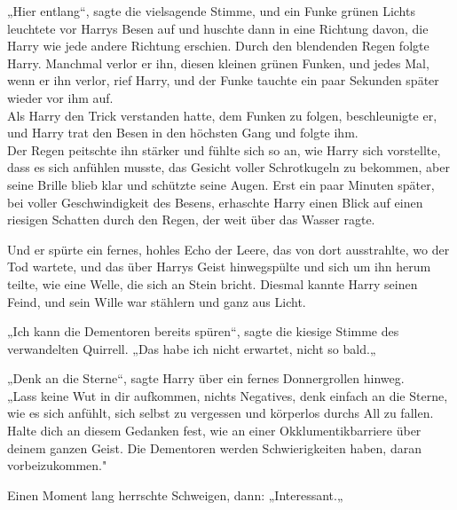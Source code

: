 {„Hier entlang“, sagte die vielsagende Stimme, und ein Funke grünen Lichts leuchtete vor Harrys Besen auf und huschte dann in eine Richtung davon, die Harry wie jede andere Richtung erschien. Durch den blendenden Regen folgte Harry. Manchmal verlor er ihn, diesen kleinen grünen Funken, und jedes Mal, wenn er ihn verlor, rief Harry, und der Funke tauchte ein paar Sekunden später wieder vor ihm auf.\\ Als Harry den Trick verstanden hatte, dem Funken zu folgen, beschleunigte er, und Harry trat den Besen in den höchsten Gang und folgte ihm.\\ Der Regen peitschte ihn stärker und fühlte sich so an, wie Harry sich vorstellte, dass es sich anfühlen musste, das Gesicht voller Schrotkugeln zu bekommen, aber seine Brille blieb klar und schützte seine Augen. Erst ein paar Minuten später, bei voller Geschwindigkeit des Besens, erhaschte Harry einen Blick auf einen riesigen Schatten durch den Regen, der weit über das Wasser ragte.

Und er spürte ein fernes, hohles Echo der Leere, das von dort ausstrahlte, wo der Tod wartete, und das über Harrys Geist hinwegspülte und sich um ihn herum teilte, wie eine Welle, die sich an Stein bricht. Diesmal kannte Harry seinen Feind, und sein Wille war stählern und ganz aus Licht.

„Ich kann die Dementoren bereits spüren“, sagte die kiesige Stimme des verwandelten Quirrell. „Das habe ich nicht erwartet, nicht so bald.„

„Denk an die Sterne“, sagte Harry über ein fernes Donnergrollen hinweg.\\ „Lass keine Wut in dir aufkommen, nichts Negatives, denk einfach an die Sterne, wie es sich anfühlt, sich selbst zu vergessen und körperlos durchs All zu fallen.\\ Halte dich an diesem Gedanken fest, wie an einer Okklumentikbarriere über deinem ganzen Geist. Die Dementoren werden Schwierigkeiten haben, daran vorbeizukommen."

Einen Moment lang herrschte Schweigen, dann: „Interessant.„

}

